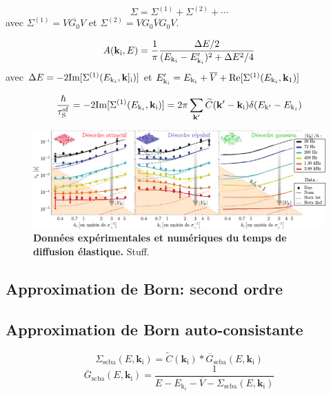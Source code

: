 \begin{equation}
\Sigma=\Sigma^{(1)}+\Sigma^{(2)} + \cdots
\end{equation}
avec $\Sigma^{(1)}=\overline{V G_0 V}$ et $\Sigma^{(2)}=\overline{V G_0 V G_0 V}$.

\begin{equation}
A(\mathbf{k}_{\mathrm{i}},E)= \frac{1}{\pi} \frac{\Delta E/2}{(E_{\mathrm{k}_i} - E_{\mathrm{k}_i}')^2+\Delta E^2/4}
\end{equation}
avec $\Delta E=-2 \mathrm{Im}[\Sigma^{(1)}(E_{\mathrm{k}_i},\mathbf{k}]_{\mathrm{i}})]$ et $E_{\mathrm{k}_i}'=E_{\mathrm{k}_i}+\overline{V}+\mathrm{Re}[\Sigma^{(1)}(E_{\mathrm{k}_i},\mathbf{k}_{\mathrm{1}})]$

\begin{equation}
\frac{\hslash}{\tau_{\mathrm{S}}^{\mathrm{sf}}}=-2 \mathrm{Im}[\Sigma^{(1)}(E_{\mathrm{k}_i},\mathbf{k}_{\mathrm{i}})]=2\pi \sum_{\mathbf{k}'}{\widetilde{C}(\mathbf{k}'-\mathbf{k}_{\mathrm{i}}) \delta(E_{\mathrm{k}'}-E_{\mathrm{k}_i})}
\end{equation}

\begin{figure}
\centering
\includegraphics[width=\textwidth]{Fig/TauS_NJP/donnees_taus_ordre3.pdf}
\caption{\textbf{Données expérimentales et numériques du temps de diffusion élastique.} Stuff.}
\label{fig:donnees_taus_ordre_3}
\end{figure}


\subsection{Approximation de Born: second ordre}
\subsection{Approximation de Born auto-consistante}
\begin{equation}
\Sigma_{\mathrm{scba}}(E,\mathbf{k}_{\mathrm{i}})=\widetilde{C}(\mathbf{k}_{\mathrm{i}})\ast \overline{G}_{\mathrm{scba}}(E,\mathbf{k}_{\mathrm{i}})
\end{equation}
\begin{equation}
\overline{G}_{\mathrm{scba}}(E,\mathbf{k}_{\mathrm{i}}) = \frac{1}{E-E_{\mathrm{k}_i} - \overline{V} - \Sigma_{\mathrm{scba}}(E,\mathbf{k}_{\mathrm{i}})}
\end{equation}

